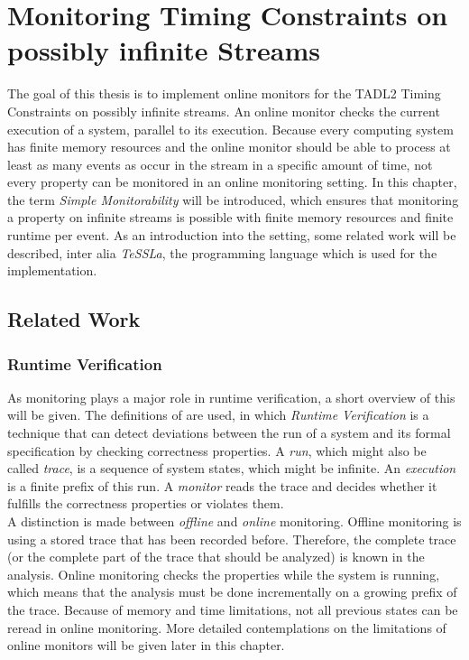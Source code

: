 
\chapter{Monitoring Timing Constraints on possibly infinite Streams}
\label{chapter-monitorability}
	The goal of this thesis is to implement online monitors for the TADL2 Timing Constraints on possibly infinite streams. An online monitor checks the current execution of a system, parallel to its execution. Because every computing system has finite memory resources and the online monitor should be able to process at least as many events as occur in the stream in a specific amount of time, not every property can be monitored in an online monitoring setting. In this chapter, the term \emph{Simple Monitorability} will be introduced, which ensures that monitoring a property on infinite streams is possible with finite memory resources and finite runtime per event. As an introduction into the setting, some related work will be described, inter alia \emph{TeSSLa}, the programming language which is used for the implementation.

\section{Related Work}

	\subsection{Runtime Verification}
		As monitoring plays a major role in runtime verification, a short overview of this will be given. The definitions of \cite{RuntimeVerification} are used, in which \emph{Runtime Verification} is a technique that can detect deviations between the run of a system and its formal specification by checking correctness properties. A \emph{run}, which might also be called \emph{trace}, is a sequence of system states, which might be infinite. An \emph{execution} is a finite prefix of this run. A \emph{monitor} reads the trace and decides whether it fulfills the correctness properties or violates them.\\
		A distinction is made between \emph{offline} and \emph{online} monitoring. Offline monitoring is using a stored trace that has been recorded before. Therefore, the complete trace (or the complete part of the trace that should be analyzed) is known in the analysis. Online monitoring checks the properties while the system is running, which means that the analysis must be done incrementally on a growing prefix of the trace. Because of memory and time limitations, not all previous states can be reread in online monitoring. More detailed contemplations on the limitations of online monitors will be given later in this chapter.

